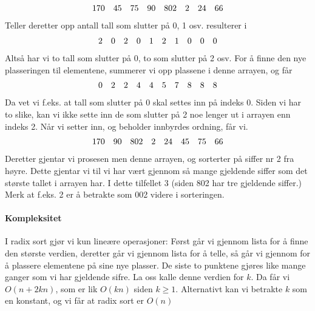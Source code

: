 \begin{example}
  \begin{displaymath}
    \begin{array}{c c c c c c c c}
      170&45&75&90&802&2&24&66
    \end{array}
  \end{displaymath}
  Teller deretter opp antall tall som slutter på 0, 1 osv. resulterer i
  \begin{displaymath}
    \begin{array}{c c c c c c c c c c}
      2&0&2&0&1&2&1&0&0&0
    \end{array}
  \end{displaymath}
  Altså har vi to tall som slutter på 0, to som slutter på 2 osv. For å finne
  den nye plasseringen til elementene, summerer vi opp plassene i denne arrayen,
  og får
  \begin{displaymath}
    \begin{array}{c c c c c c c c c c}
      0&2&2&4&4&5&7&8&8&8
    \end{array}
  \end{displaymath}
  Da vet vi f.eks. at tall som slutter på 0 skal settes inn på indeks 0. Siden
  vi har to slike, kan vi ikke sette inn de som slutter på 2 noe lenger ut i
  arrayen enn indeks 2. Når vi setter inn, og beholder innbyrdes ordning, får
  vi.
  \begin{displaymath}
    \begin{array}{c c c c c c c c}
      170&90&802&2&24&45&75&66
    \end{array}
  \end{displaymath}
  Deretter gjentar vi prosesen men denne arrayen, og sorterter på siffer nr 2
  fra høyre. Dette gjentar vi til vi har vært gjennom så mange gjeldende siffer
  som det største tallet i arrayen har. I dette tilfellet 3 (siden 802 har tre
  gjeldende siffer.) Merk at f.eks. 2 er å betrakte som 002 videre i sorteringen.
\end{example}

\paragraph{Kompleksitet}
I radix sort gjør vi kun lineære operasjoner: Først går vi gjennom lista for å
finne den største verdien, deretter går vi gjennom lista for å telle, så går vi
gjennom for å plassere elementene på sine nye plasser. De siste to punktene
gjøres like mange ganger som vi har gjeldende sifre. La oss kalle denne verdien
for $k$. Da får vi $O(n + 2kn)$, som er lik $O(kn)$ siden $k\geq 1$. Alternativt
kan vi betrakte $k$ som en konstant, og vi får at radix sort er $O(n)$